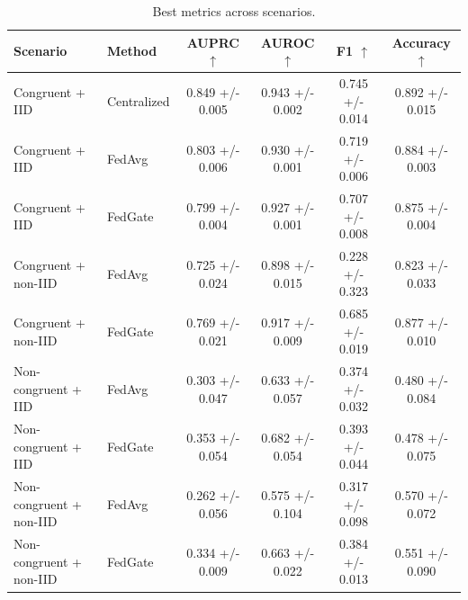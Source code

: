 \begin{table}[t]
\centering
\caption{Best metrics across scenarios.}
\label{tab:paper_best_metrics}
\begin{tabular}{llcccc}
\toprule
Scenario & Method & AUPRC $\uparrow$ & AUROC $\uparrow$ & F1 $\uparrow$ & Accuracy $\uparrow$ \\
\midrule
Congruent + IID & Centralized & 0.849 +/- 0.005 & 0.943 +/- 0.002 & 0.745 +/- 0.014 & 0.892 +/- 0.015 \\
Congruent + IID & FedAvg & 0.803 +/- 0.006 & 0.930 +/- 0.001 & 0.719 +/- 0.006 & 0.884 +/- 0.003 \\
Congruent + IID & FedGate & 0.799 +/- 0.004 & 0.927 +/- 0.001 & 0.707 +/- 0.008 & 0.875 +/- 0.004 \\
Congruent + non-IID & FedAvg & 0.725 +/- 0.024 & 0.898 +/- 0.015 & 0.228 +/- 0.323 & 0.823 +/- 0.033 \\
Congruent + non-IID & FedGate & 0.769 +/- 0.021 & 0.917 +/- 0.009 & 0.685 +/- 0.019 & 0.877 +/- 0.010 \\
Non-congruent + IID & FedAvg & 0.303 +/- 0.047 & 0.633 +/- 0.057 & 0.374 +/- 0.032 & 0.480 +/- 0.084 \\
Non-congruent + IID & FedGate & 0.353 +/- 0.054 & 0.682 +/- 0.054 & 0.393 +/- 0.044 & 0.478 +/- 0.075 \\
Non-congruent + non-IID & FedAvg & 0.262 +/- 0.056 & 0.575 +/- 0.104 & 0.317 +/- 0.098 & 0.570 +/- 0.072 \\
Non-congruent + non-IID & FedGate & 0.334 +/- 0.009 & 0.663 +/- 0.022 & 0.384 +/- 0.013 & 0.551 +/- 0.090 \\
\bottomrule
\end{tabular}
\end{table}
